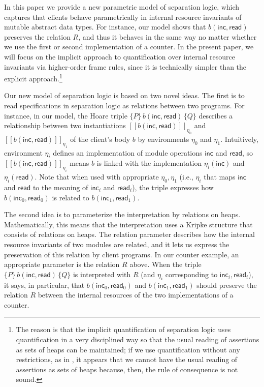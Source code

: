\documentclass{LMCS}
\newcommand{\ff}[1]{[\![#1]\!]}
\newcommand{\ctri}[3]{\{{#1}\}\,{#2}\,\{{#3}\}}
\newcommand{\inc}{\mathsf{inc}}
\newcommand{\mread}{\mathsf{read}}
\begin{document}
In this paper we provide a new parametric model of separation 
logic, which
captures that clients behave parametrically in internal resource
invariants of mutable abstract data types. For instance,
our model shows that $b(\inc,\mread)$ preserves
the relation $R$, and thus it behaves
in the same way no matter whether we use the first or second
implementation of a counter. In the present paper,
we will focus on the implicit approach to quantification over
internal resource invariants via higher-order frame rules, since it is
technically simpler than the explicit approach.\footnote{The reason is that the
implicit quantification of separation logic uses quantification in a very
disciplined way so that the usual reading of assertions as sets of heaps
can be maintained; if we use quantification without any restrictions, 
as in \cite{Benton-CSL06}, it
appears that we cannot have the usual reading of assertions as sets of
heaps because, then, the rule of consequence is not sound.}

Our new model of separation logic is based on two novel ideas.
The first is to read specifications in separation logic
as relations
between two programs. For instance, in our model, the Hoare 
triple $\ctri{P}{b(\inc,\mread)}{Q}$ describes 
a relationship between two instantiations
$\ff{b(\inc,\mread)}_{\eta_0}$ and $\ff{b(\inc,\mread)}_{\eta_1}$ of
the client's body $b$ by environments $\eta_0$ and $\eta_1$.
Intuitively, environment $\eta_i$ defines an implementation
of module operations $\inc$ and 
$\mread$, so $\ff{b(\inc,\mread)}_{\eta_i}$ means 
$b$ is linked with
the implementation $\eta_i(\inc)$ and $\eta_i(\mread)$.
Note that when used with appropriate $\eta_0,\eta_1$
(i.e., $\eta_i$ that maps $\inc$ and $\mread$ to
the meaning of $\inc_i$ and $\mread_i$), 
the triple expresses how 
$b(\inc_0,\mread_0)$ 
is related to $b(\inc_1,\mread_1)$.

The second idea is to parameterize the interpretation by
relations on heaps.
Mathematically, this means that the interpretation uses
a Kripke structure that consists of relations on heaps. 
The relation parameter describes
how the internal resource invariants of
two modules are related, and it lets us express the preservation
of this relation by client programs. In our counter example,
an appropriate parameter is the relation $R$ above. When
the triple $\ctri{P}{b(\inc,\mread)}{Q}$ is interpreted with
$R$ (and $\eta_i$ corresponding to $\inc_i,\mread_i$), 
it says, in particular, that
$b(\inc_0,\mread_0)$ and $b(\inc_1,\mread_1)$
should preserve the relation $R$ between the internal resources
of the two implementations of a counter.
\end{document}
